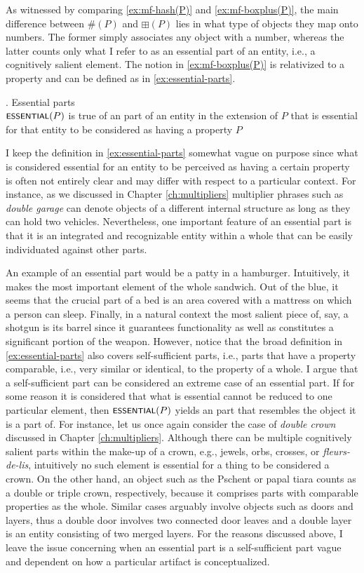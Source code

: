 	As witnessed by comparing \ref{ex:mf-hash(P)} and \ref{ex:mf-boxplus(P)}, the main difference between $\#(P)$ and $\boxplus(P)$ lies in what type of objects they map onto numbers. The former simply associates any  object with a number, whereas the latter counts only what I refer to as an essential part of an entity, i.e., a cognitively salient element. The notion  in \ref{ex:mf-boxplus(P)} is relativized to a property and can be defined as in \ref{ex:essential-parts}. 
	
	\ex. Essential parts\\
	$\cnst{essential}(P)$ is true of an  part of an entity in the extension of $P$ that is essential for that entity to be considered as having a property $P$\label{ex:essential-parts}
	
	I keep the definition in \ref{ex:essential-parts} somewhat vague on purpose since what is considered essential for an entity to be perceived as having a certain property is often not entirely clear and may differ with respect to a particular context. For instance, as we discussed in Chapter \ref{ch:multipliers} multiplier phrases such as \textit{double garage} can denote objects of a different internal structure as long as they can hold two vehicles. Nevertheless, one important feature of an essential part is that it is an integrated and recognizable entity within a whole that can be easily individuated against other parts.
	
	An example of an essential part would be a patty in a hamburger. Intuitively, it makes the most important element of the whole sandwich. Out of the blue, it seems that the crucial part of a bed is an area covered with a mattress on which a person can sleep. Finally, in a natural context the most salient piece of, say, a shotgun is its barrel since it guarantees functionality as well as constitutes a significant portion of the weapon. However, notice that the broad definition in \ref{ex:essential-parts} also covers self-sufficient parts, i.e., parts that have a property comparable, i.e., very similar or identical, to the property of a whole. I argue that a self-sufficient part can be considered an extreme case of an essential part. If for some reason it is considered that what is essential cannot be reduced to one particular element, then $\cnst{essential}(P)$ yields an  part that resembles the object it is a part of. For instance, let us once again consider the case of \textit{double crown} discussed in Chapter \ref{ch:multipliers}. Although there can be multiple cognitively salient parts within the make-up of a crown, e.g., jewels, orbs, crosses, or \textit{fleurs-de-lis}, intuitively no such element is essential for a thing to be considered a crown. On the other hand, an object such as the Pschent or papal tiara counts as a double or triple crown, respectively, because it comprises parts with comparable properties as the whole. Similar cases arguably involve objects such as doors and layers, thus a double door involves two connected door leaves and a double layer is an entity consisting of two merged layers. For the reasons discussed above, I leave the issue concerning when an essential part is a self-sufficient part vague and dependent on how a particular artifact is conceptualized.
	
